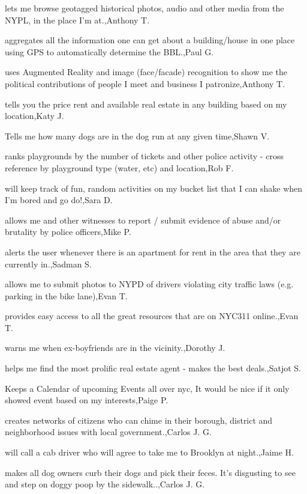 \documentclass{article}
\begin{document}
lets me browse geotagged historical photos, audio and other media from the NYPL, in the place I'm at.,Anthony T.

aggregates all the information one can get about a building/house in one place using GPS to automatically determine the BBL.,Paul G.

uses Augmented Reality and image (face/facade) recognition to show me the political contributions of people I meet and business I patronize,Anthony T.

tells you the price rent and available real estate in any building based on my location,Katy J.

Tells me how many dogs are in the dog run at any given time,Shawn V.

ranks playgrounds by the number of tickets and other police activity - cross reference by playground type (water, etc) and location,Rob F.

will keep track of fun, random activities on my bucket list that I can shake when I'm bored and go do!,Sara D.

allows me and other witnesses to report / submit evidence of abuse and/or brutality by police officers,Mike P.

alerts the user whenever there is an apartment for rent in the area that they are currently in.,Sadman S.

allows me to submit photos to NYPD of drivers violating city traffic laws (e.g. parking in the bike lane),Evan T.

provides easy access to all the great resources that are on NYC311 online.,Evan T.

warns me when ex-boyfriends are in the vicinity.,Dorothy J.

helps me find the most prolific real estate agent - makes the best deals.,Satjot S.

Keeps a Calendar of upcoming Events all over nyc, It would be nice if it only showed event based on my interests,Paige P.

creates networks of citizens who can chime in their borough, district and neighborhood issues with local government.,Carlos J.  G.

will call a cab driver who will agree to take me to Brooklyn at night.,Jaime H.

makes all dog owners curb their dogs and pick their feces. It's disgusting to see and step on doggy poop by the sidewalk..,Carlos J.  G.
\end{document}
